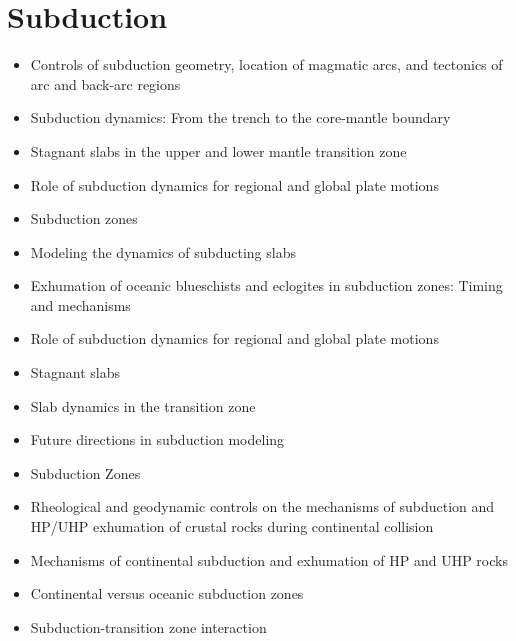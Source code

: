 

\section{Subduction}

   \begin{itemize}
   \item [\nineteeneightytwo] Controls of subduction geometry, location of magmatic arcs,
                              and tectonics of arc and back-arc regions \cite{crpi82}
   \item [\nineteenninetyfive] Subduction dynamics: From the trench
                               to the core-mantle boundary \cite{kinc95}
   \item [\twothousandone] Stagnant slabs in the upper and lower mantle transition zone \cite{fuwo01}
   \item [\twothousandone] Role of subduction dynamics for regional and global plate motions \cite{befa09}
   \item [\twothousandtwo] Subduction zones \cite{ster02}
   \item [\twothousandeight]Modeling the dynamics of subducting slabs \cite{bill08}
   \item [\twothousandnine] Exhumation of oceanic blueschists and eclogites in subduction zones: Timing and mechanisms \cite{agyj09}
   \item [\twothousandnine] Role of subduction dynamics for regional and global plate motions \cite{befa09}
   \item [\twothousandnine] Stagnant slabs \cite{fuon09}
   \item [\twothousandten]  Slab dynamics in the transition zone \cite{bill10}
   \item [\twothousandeleven] Future directions in subduction modeling \cite{gery11}
   \item [\twothousandthirteen] Subduction Zones \cite{bufv13}
   \item [\twothousandfourteen] Rheological and geodynamic controls on the mechanisms of subduction
and HP/UHP exhumation of crustal rocks during continental collision \cite{bufa14}
   \item [\twothousandfourteen] Mechanisms of continental subduction and exhumation of HP and UHP rocks \cite{bufy14b}
   \item [\twothousandsixteen]  Continental versus oceanic subduction zones \cite{zhch16}
   \item [\twothousandseventeen] Subduction-transition zone interaction \cite{goav17}

\end{itemize}
